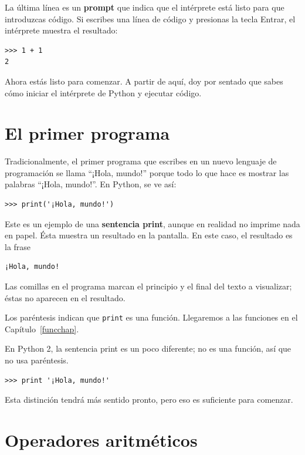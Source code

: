 \documentclass[10pt]{book}
\begin{document}
La última línea es un {\bf prompt} que indica que el intérprete está listo
para que introduzcas código.
Si escribes una línea de código y presionas la tecla Entrar, el intérprete
muestra el resultado:

\begin{verbatim}
>>> 1 + 1
2
\end{verbatim}
%
Ahora estás listo para comenzar.
A partir de aquí, doy por sentado que sabes cómo iniciar el intérprete de Python
y ejecutar código.


\section{El primer programa}
\label{hello}

Tradicionalmente, el primer programa que escribes en un nuevo lenguaje
de programación se llama ``¡Hola, mundo!'' porque todo lo que hace es mostrar
las palabras ``¡Hola, mundo!''.  En Python, se ve así:

\begin{verbatim}
>>> print('¡Hola, mundo!')
\end{verbatim}
%
Este es un ejemplo de una {\bf sentencia print}, aunque
en realidad no imprime nada en papel.  Ésta muestra un resultado en la
pantalla.  En este caso, el resultado es la frase

\begin{verbatim}
¡Hola, mundo!
\end{verbatim}
%
Las comillas en el programa marcan el principio y el final
del texto a visualizar; éstas no aparecen en el resultado.

Los paréntesis indican que {\tt print} es una función.  Llegaremos
a las funciones en el Capítulo~\ref{funcchap}.
 

En Python 2, la sentencia print es un poco diferente; no es
una función, así que no usa paréntesis.

\begin{verbatim}
>>> print '¡Hola, mundo!'
\end{verbatim}
%
Esta distinción tendrá más sentido pronto, pero eso es suficiente para
comenzar.


\section{Operadores aritméticos}
\end{document}
